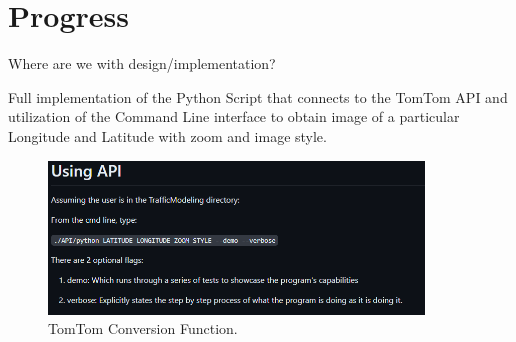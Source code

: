 \section{Progress}

Where are we with design/implementation?

Full implementation of the Python Script that connects to the TomTom API and utilization of the Command Line interface to obtain image of a particular Longitude and Latitude with zoom and image style.

\begin{figure}[!ht]
    \centering
    \includegraphics[width=10cm]{../Images/Update4/APIInstructions.png}
       \caption{TomTom Conversion Function.}
           \label{Fig:ConversionFunction}
\end{figure}

